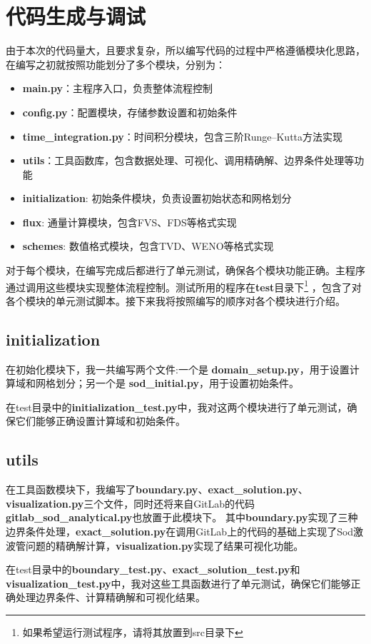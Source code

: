 \documentclass[UTF8]{ctexart}
\begin{document}
\section{代码生成与调试}
由于本次的代码量大，且要求复杂，所以编写代码的过程中严格遵循模块化思路，在编写之初就按照功能划分了多个模块，分别为：
\begin{itemize}
    \item \textbf{main.py}：主程序入口，负责整体流程控制
    \item \textbf{config.py}：配置模块，存储参数设置和初始条件
    \item \textbf{time\_integration.py}：时间积分模块，包含三阶Runge--Kutta方法实现
    \item \textbf{utils}：工具函数库，包含数据处理、可视化、调用精确解、边界条件处理等功能
    \item \textbf{initialization}: 初始条件模块，负责设置初始状态和网格划分
    \item \textbf{flux}: 通量计算模块，包含FVS、FDS等格式实现
    \item \textbf{schemes}: 数值格式模块，包含TVD、WENO等格式实现
\end{itemize}
对于每个模块，在编写完成后都进行了单元测试，确保各个模块功能正确。主程序通过调用这些模块实现整体流程控制。测试所用的程序在\textbf{test}目录下\footnote{如果希望运行测试程序，请将其放置到src目录下}
，包含了对各个模块的单元测试脚本。接下来我将按照编写的顺序对各个模块进行介绍。
\subsection{initialization}
在初始化模块下，我一共编写两个文件:一个是 \textbf{domain\_setup.py}，用于设置计算域和网格划分；另一个是 \textbf{sod\_initial.py}，用于设置初始条件。

在test目录中的\textbf{initialization\_test.py}中，我对这两个模块进行了单元测试，确保它们能够正确设置计算域和初始条件。
\subsection{utils}
在工具函数模块下，我编写了\textbf{boundary.py}、\textbf{exact\_solution.py}、\textbf{visualization.py}三个文件，同时还将来自GitLab\cite{sodcal2025}的代码\textbf{gitlab\_sod\_analytical.py}也放置于此模块下。
其中\textbf{boundary.py}实现了三种边界条件处理，\textbf{exact\_solution.py}在调用GitLab上的代码的基础上实现了Sod激波管问题的精确解计算，\textbf{visualization.py}实现了结果可视化功能。

在test目录中的\textbf{boundary\_test.py}、\textbf{exact\_solution\_test.py}和\textbf{visualization\_test.py}中，我对这些工具函数进行了单元测试，确保它们能够正确处理边界条件、计算精确解和可视化结果。
\end{document}

